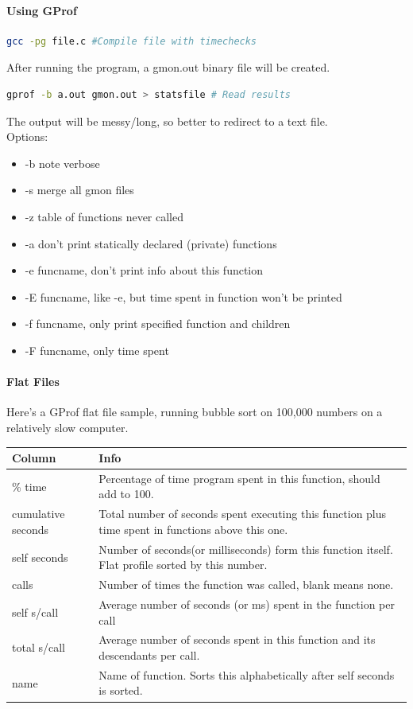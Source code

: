 \documentclass[12 pt]{article}
\begin{document}
\paragraph{Using GProf}
\begin{lstlisting}[language=bash]
gcc -pg file.c #Compile file with timechecks
\end{lstlisting}
After running the program, a gmon.out binary file will be created.
\begin{lstlisting}[language=bash]
gprof -b a.out gmon.out > statsfile # Read results
\end{lstlisting}
The output will be messy/long, so better to redirect to a text file.
\\ Options:
\begin{itemize}
\item -b note verbose
\item -s merge all gmon files
\item -z table of functions never called
\item -a don't print statically declared (private) functions
\item -e funcname, don't print info about this function
\item -E funcname, like -e, but time spent in function won't be printed
\item -f funcname, only print specified function and children
\item -F funcname, only time spent
\end{itemize}
\paragraph{Flat Files} Here's a GProf flat file sample, running bubble sort on 100,000 numbers on a relatively slow computer.

\begin{tabularx}{1.0\linewidth}{|X|X|}
 \hline \textbf{Column}&\textbf{Info}
  \\ \hline \% time & Percentage of time program spent in this function, should add to 100.
  \\ \hline cumulative seconds & Total number of seconds spent executing this function plus time spent in functions above this one.
  \\ \hline self seconds & Number of seconds(or milliseconds) form this function itself. Flat profile sorted by this number.
  \\ \hline calls & Number of times the function was called, blank means none.
  \\ \hline self s/call & Average number of seconds (or ms) spent in the function per call
  \\ \hline total s/call & Average number of seconds spent in this function and its descendants per call.
  \\ \hline name & Name of function. Sorts this alphabetically after self seconds is sorted.
  \\ \hline
\end{tabularx}
\end{document}
